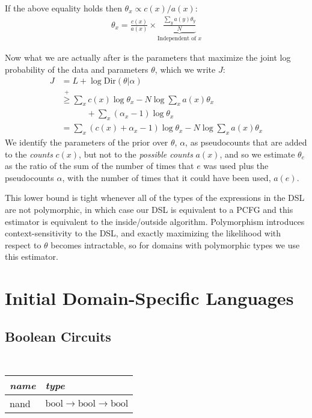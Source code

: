 \documentclass{article}
\begin{document}
If the above equality holds then $\theta_x \propto c(x)/a(x)$:
\begin{align}
  \theta_x = \frac{c(x)}{a(x)}\times \underbrace{\frac{\sum_y a(y)\theta_y}{N}}_{\text{Independent of $x$}}
\end{align}

Now what we are actually after is the parameters that maximize the joint log probability of the data and parameters $\theta$, which we  write $J$:
\begin{align}
  \nonumber J& = L + \log \text{Dir}(\theta|\alpha)\\
  \nonumber&\stackrel{+}{\geq } \sum_x c(x)\log \theta_x - N \log \sum_x a(x)\theta_x \\
  \nonumber&\qquad\quad+ \sum_x(\alpha_x - 1)\log \theta_x\\
  & = \sum_x (c(x) + \alpha_x - 1)\log \theta_x -  N \log \sum_x a(x)\theta_x
\end{align}
We identify the parameters of the prior over $\theta$, $\alpha$, as  pseudocounts that are added to the \emph{counts} $c(x)$, but not to the \emph{possible counts} $a(x)$,
and so we estimate $\theta_e$ as the ratio of the sum of the number of times that $e$ was used plus the pseudocounts $\alpha$, with the number of times that it could have been used, $a(e)$.



This lower bound is tight whenever all
of the types of the expressions in the DSL are not polymorphic, in which case our DSL is equivalent to a PCFG
and this estimator is equivalent to the inside/outside algorithm.
Polymorphism introduces context-sensitivity to the DSL,
and exactly maximizing the likelihood with respect to $\theta$
becomes intractable,
so for domains with polymorphic types we use this estimator.

\section{Initial Domain-Specific Languages}
\subsection{Boolean Circuits}
\begin{center}
\tt
\begin{tabular}{| l | l |}
  \hline
  \textrm{\emph{name}} & \textrm{\emph{type}} \\
  \hline
    nand & $\text{bool}\to \text{bool}\to \text{bool}$ \\  \hline
\end{tabular}
\end{center}
\end{document}
